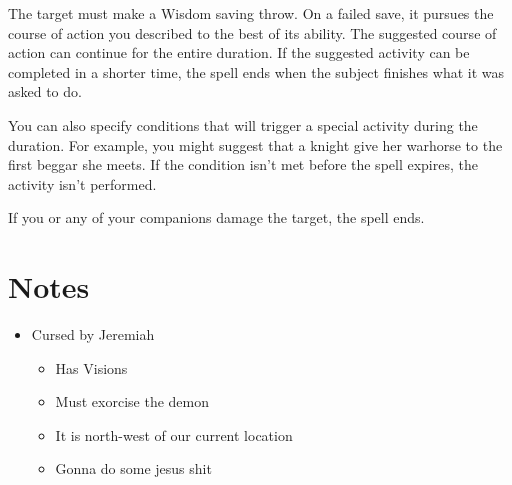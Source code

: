 \documentclass[11pt]{article}
\begin{document}
The target must make a Wisdom saving throw. On a failed save, it pursues the course of action you described to the best of its ability. The suggested course of action can continue for the entire duration. If the suggested activity can be completed in a shorter time, the spell ends when the subject finishes what it was asked to do.

You can also specify conditions that will trigger a special activity during the duration. For example, you might suggest that a knight give her warhorse to the first beggar she meets. If the condition isn't met before the spell expires, the activity isn't performed.

If you or any of your companions damage the target, the spell ends.
\section{Notes}
\label{sec:org2aabcfd}
\begin{itemize}
\item Cursed by Jeremiah
\begin{itemize}
\item Has Visions
\item Must exorcise the demon
\item It is north-west of our current location
\item Gonna do some jesus shit
\end{itemize}
\end{itemize}
\end{document}
